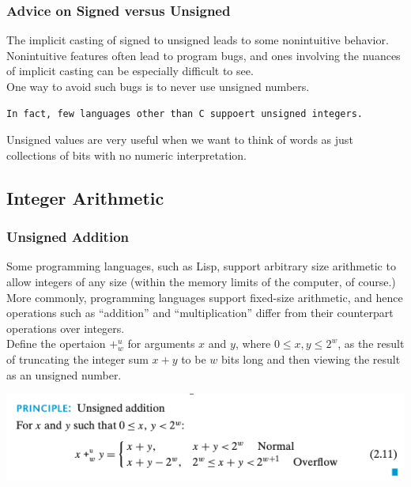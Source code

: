 \documentclass[11pt]{article}
\begin{document}
\subsubsection{Advice on Signed versus Unsigned}
\label{sec:org6dd446c}
The implicit casting of signed to unsigned leads to some nonintuitive behavior. Nonintuitive features often lead to program bugs, and ones involving the nuances of implicit casting can be especially difficult to see.\\

One way to avoid such bugs is to never use unsigned numbers.\\
\begin{verbatim}
In fact, few languages other than C suppoert unsigned integers.
\end{verbatim}

Unsigned values are very useful when we want to think of words as just collections of bits with no numeric interpretation.\\

\subsection{Integer Arithmetic}
\label{sec:orge9ec170}

\subsubsection{Unsigned Addition}
\label{sec:org68e6311}
Some programming languages, such as Lisp, support arbitrary size arithmetic to allow integers of any size (within the memory limits of the computer, of course.) More commonly, programming languages support fixed-size arithmetic, and hence operations such as “addition” and “multiplication” differ from their counterpart operations over integers.\\


Define the opertaion \(+_w^u\) for arguments \(x\) and \(y\), where \(0 \le x,y \le 2^w\), as the result of truncating the integer sum \(x + y\) to be \(w\) bits long and then viewing the result as an unsigned number.\\

\begin{center}
\includegraphics[width=.9\linewidth]{pics/unsigned-addition.png}
\end{center}
\end{document}
